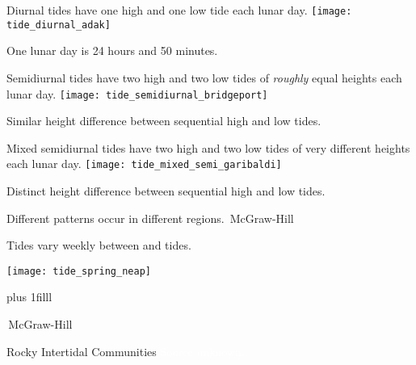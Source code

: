 \documentclass[t]{beamer}
\begin{document}
\begin{frame}{Diurnal tides have one high and one low tide each lunar day.}
\texttt{[image: tide\_diurnal\_adak]}

\hangpara One lunar day is 24 hours and 50 minutes.
\end{frame}

\begin{frame}{Semidiurnal tides have two high and two low tides of \emph{roughly} equal heights each lunar day.}
\texttt{[image: tide\_semidiurnal\_bridgeport]}

\hangpara Similar height difference between sequential high and low tides.
\end{frame}

\begin{frame}{Mixed semidiurnal tides have two high and two low tides of very different heights each lunar day.}
\texttt{[image: tide\_mixed\_semi\_garibaldi]}

\hangpara Distinct height difference between sequential high and low tides.
\end{frame}

{
\begin{frame}[b]{Different patterns occur in different regions.}
\hfill\tiny\textcopyright\,McGraw-Hill
\end{frame}
}

\begin{frame}[t]{Tides vary weekly between  and  tides.}

	\vspace*{-\baselineskip}

	\begin{center}
		\texttt{[image: tide\_spring\_neap]} 
	\end{center}

\vskip0pt plus 1filll

\tiny\textcopyright\,McGraw-Hill

\end{frame}


{
\begin{frame}[b]{Rocky Intertidal Communities}
\tiny\textcolor{white}{Source unknown.}
\end{frame}
}
\end{document}

